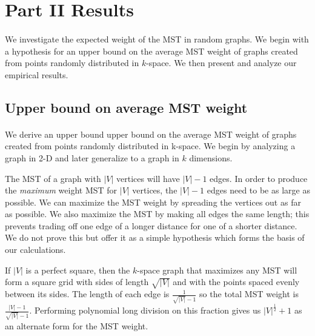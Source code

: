 \section{Part II Results}
\label{sec:part2}

\paragraph{}
We investigate the expected weight of the MST in random graphs. We begin with a
hypothesis for an upper bound on the average MST weight of graphs created from
points randomly distributed in $k$-space. We then present and analyze our
empirical results.


\subsection{Upper bound on average MST weight}
\paragraph{}
We derive an upper bound upper bound on the average MST weight of graphs created
from points randomly distributed in k-space. We begin by analyzing a graph in
2-D and later generalize to a graph in $k$ dimensions.

The MST of a graph with $|V|$ vertices will have $|V|-1$ edges. In order to
produce the \textit{maximum} weight MST for $|V|$ vertices, the $|V|-1$ edges
need to be as large as possible. We can maximize the MST weight by spreading
the vertices out as far as possible. We also maximize the MST by making all
edges the same length; this prevents trading off one edge of a longer distance
for one of a shorter distance. We do not prove this but offer it as a simple
hypothesis which forms the basis of our calculations.

If $|V|$ is a perfect square, then the $k$-space graph that maximizes any MST will form a
square grid with sides of length $\sqrt{|V|}$ and with the points spaced evenly
between its sides. The length of each edge is $\frac{1}{\sqrt{|V|}-1}$ so the
total MST weight is $\frac{|V|-1}{\sqrt{|V|}-1}$. Performing polynomial long
division on this fraction gives us $|V|^{\frac{1}{2}}+1$ as an alternate form
for the MST weight.

